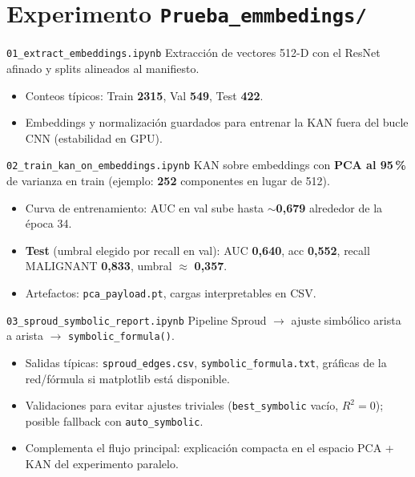 \documentclass[aspectratio=169,spanish]{beamer}
\begin{document}
\section{Experimento \texttt{Prueba\_emmbedings/}}

\begin{frame}{\texttt{01\_extract\_embeddings.ipynb}}
  Extracción de vectores 512-D con el ResNet afinado y splits alineados al manifiesto.
  \begin{itemize}
    \item Conteos típicos: Train \textbf{2315}, Val \textbf{549}, Test \textbf{422}.
    \item Embeddings y normalización guardados para entrenar la KAN fuera del bucle CNN (estabilidad en GPU).
  \end{itemize}
\end{frame}

\begin{frame}{\texttt{02\_train\_kan\_on\_embeddings.ipynb}}
  KAN sobre embeddings con \textbf{PCA al 95\,\%} de varianza en train (ejemplo: \textbf{252} componentes en lugar de 512).
  \begin{itemize}
    \item Curva de entrenamiento: AUC en val sube hasta $\sim$\textbf{0{,}679} alrededor de la época 34.
    \item \textbf{Test} (umbral elegido por recall en val): AUC \textbf{0{,}640}, acc \textbf{0{,}552}, recall MALIGNANT \textbf{0{,}833}, umbral $\approx$ \textbf{0{,}357}.
    \item Artefactos: \texttt{pca\_payload.pt}, cargas interpretables en CSV.
  \end{itemize}
\end{frame}

\begin{frame}{\texttt{03\_sproud\_symbolic\_report.ipynb}}
  Pipeline Sproud $\rightarrow$ ajuste simbólico arista a arista $\rightarrow$ \texttt{symbolic\_formula()}.
  \begin{itemize}
    \item Salidas típicas: \texttt{sproud\_edges.csv}, \texttt{symbolic\_formula.txt}, gráficas de la red/fórmula si matplotlib está disponible.
    \item Validaciones para evitar ajustes triviales (\texttt{best\_symbolic} vacío, $R^2=0$); posible fallback con \texttt{auto\_symbolic}.
    \item Complementa el flujo principal: explicación compacta en el espacio PCA + KAN del experimento paralelo.
  \end{itemize}
\end{frame}
\end{document}
